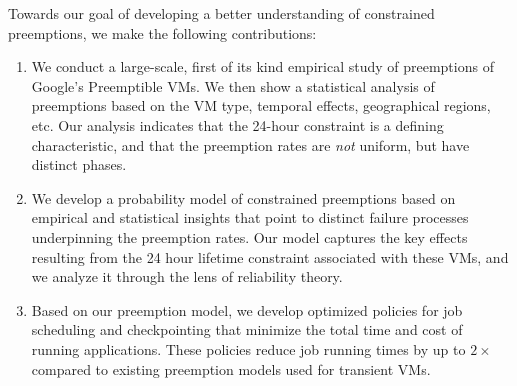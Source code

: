 Towards our goal of developing a better understanding of constrained preemptions, we make the following contributions:
\begin{enumerate} [leftmargin=12pt]

\item We conduct a large-scale, first of its kind empirical study of preemptions of Google's Preemptible VMs. We then show a statistical analysis of preemptions based on the VM type, temporal effects, geographical regions, etc. Our analysis 
  indicates that the 24-hour constraint is a defining characteristic, and that the preemption rates are \emph{not} uniform, but have distinct phases. 

\item We develop a probability model of constrained preemptions based on empirical and statistical insights that point to distinct failure processes underpinning the preemption rates. Our model captures the key effects resulting from the 24 hour lifetime constraint associated with these VMs, and we analyze it through the lens of reliability theory.


\item Based on our preemption model, we develop optimized policies for job scheduling and checkpointing that minimize the total time and cost of running applications. These policies reduce job running times by up to $2\times$ compared to existing preemption models used for transient VMs. 
  


\end{enumerate}
